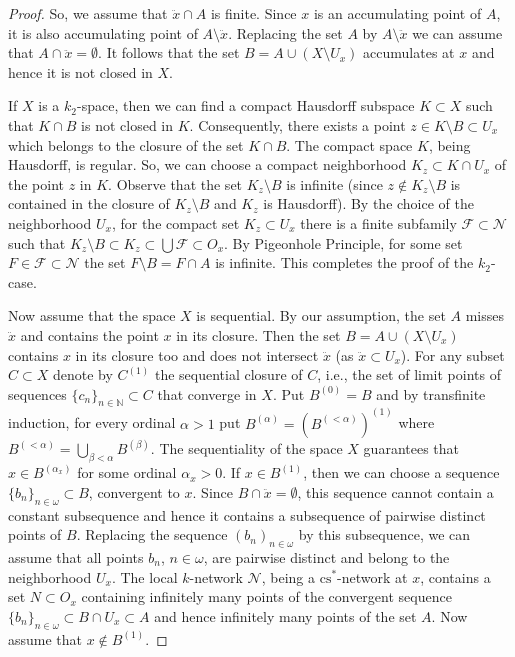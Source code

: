 \documentclass{amsart}
\theoremstyle{definition}
\begin{document}
\begin{proof}
So, we assume that $\ddot x\cap A$ is finite. Since $x$ is an accumulating point of $A$, it is also accumulating point of $A\setminus \ddot x$. Replacing the set $A$ by $A\setminus \ddot x$ we can assume that
$A\cap \ddot x=\emptyset$.
It follows that the set $B=A\cup (X\setminus U_x)$ accumulates at $x$ and hence it is not closed in $X$.

If $X$ is a $k_2$-space, then we can find a compact Hausdorff subspace $K\subset X$ such that $K\cap B$ is not closed in $K$. Consequently, there exists a point $z\in K\setminus B\subset U_x$ which belongs to the closure of the set $K\cap B$. The compact space $K$, being Hausdorff, is regular. So, we can choose a compact neighborhood $K_z\subset K\cap U_x$ of the point $z$ in $K$. Observe that the set $K_z\setminus B$ is infinite (since $z\notin K_z\setminus B$ is contained in the closure of $K_z\setminus B$ and $K_z$ is Hausdorff). By the choice of the neighborhood $U_x$, for the compact set $K_z\subset U_x$ there is a finite subfamily ${\mathcal F}\subset\mathcal N$ such that $K_z\setminus B\subset K_z\subset\bigcup{\mathcal F}\subset O_x$. By Pigeonhole Principle, for some set $F\in{\mathcal F}\subset\mathcal N$ the set $F\setminus B=F\cap A$ is infinite. This completes the proof of the $k_2$-case.
\smallskip

Now assume that the space $X$ is sequential. By our assumption, the set $A$ misses $\ddot x$ and contains the point $x$ in its closure. Then the set $B=A\cup(X\setminus U_x)$ contains $x$ in its closure too and does not intersect $\ddot x$ (as $\ddot x\subset U_x$). For any subset $C\subset X$ denote by $C^{(1)}$ the sequential closure of $C$, i.e., the set of limit points of sequences $\{c_n\}_{n\in{\mathbb N}}\subset C$ that converge in $X$. Put $B^{(0)}=B$ and by transfinite induction, for every ordinal $\alpha>1$ put $B^{(\alpha)}=(B^{(<\alpha)})^{(1)}$ where $B^{(<\alpha)}=\bigcup_{\beta<\alpha}B^{(\beta)}$. The sequentiality of the space $X$ guarantees that $x\in B^{(\alpha_x)}$ for some ordinal $\alpha_x>0$. If $x\in B^{(1)}$, then we can choose a sequence $\{b_n\}_{n\in{\omega}}\subset B$, convergent to $x$.
Since $B\cap \ddot x=\emptyset$, this sequence cannot contain a constant subsequence and hence it contains a subsequence of pairwise distinct points of $B$. Replacing the sequence $(b_n)_{n\in{\omega}}$ by this subsequence, we can assume that all points $b_n$, $n\in{\omega}$, are pairwise distinct and belong to the neighborhood $U_x$. The local $k$-network $\mathcal N$, being a ${\mathrm{cs}}^*$-network at $x$, contains a set $N\subset O_x$ containing infinitely many points of the convergent sequence $\{b_n\}_{n\in{\omega}}\subset B\cap U_x\subset A$ and hence infinitely many points of the set $A$. Now assume that $x\notin B^{(1)}$.


\end{proof}
\end{document}
